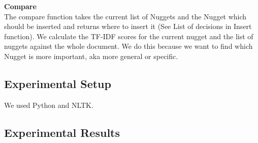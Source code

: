 
\textbf{Compare}\\

The compare function takes the current list of Nuggets and the Nugget which should be inserted and returns where to insert it (See List of decisions in Insert function). We calculate the TF-IDF scores for the current nugget and the list of nuggets against the whole document. We do this because we want to find which Nugget is more important, aka more general or specific.


\subsection{Experimental Setup}

We used Python and NLTK.

\subsection{Experimental Results}

